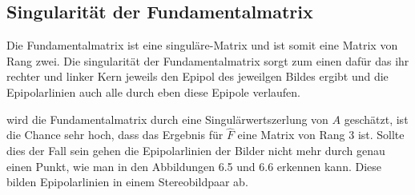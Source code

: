 \subsection{Singularität der Fundamentalmatrix}
\label{sec:realFun}

Die Fundamentalmatrix ist eine singuläre-Matrix und ist somit eine Matrix von Rang zwei. Die singularität der Fundamentalmatrix sorgt zum einen dafür das ihr rechter und linker Kern jeweils den Epipol des jeweilgen Bildes ergibt und die Epipolarlinien auch alle durch eben diese Epipole verlaufen\cite{HZ}. 

wird die Fundamentalmatrix durch eine Singulärwertszerlung von $A$ geschätzt, ist die Chance sehr hoch, dass das Ergebnis für $\hat{F}$ eine Matrix von Rang 3 ist. Sollte dies der Fall sein gehen die Epipolarlinien der Bilder nicht mehr durch genau einen Punkt, wie man in den Abbildungen 6.5 und 6.6 erkennen kann. Diese bilden Epipolarlinien in einem Stereobildpaar ab.\\

